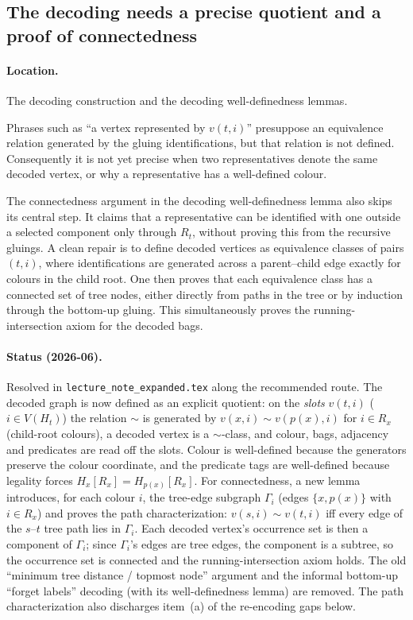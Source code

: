 \documentclass[11pt]{article}
\begin{document}
\subsection{The decoding needs a precise quotient and a proof of connectedness}

\paragraph{Location.} The decoding construction and the decoding
well-definedness lemmas.

Phrases such as ``a vertex represented by \(v(t,i)\)'' presuppose an equivalence
relation generated by the gluing identifications, but that relation is not
defined.  Consequently it is not yet precise when two representatives denote
the same decoded vertex, or why a representative has a well-defined colour.

The connectedness argument in the decoding well-definedness lemma also skips its
central step.  It
claims that a representative can be identified with one outside a selected
component only through \(R_t\), without proving this from the recursive gluings.
A clean repair is to define decoded vertices as equivalence classes of pairs
\((t,i)\), where identifications are generated across a parent--child edge
exactly for colours in the child root.  One then proves that each equivalence
class has a connected set of tree nodes, either directly from paths in the tree
or by induction through the bottom-up gluing.  This simultaneously proves the
running-intersection axiom for the decoded bags.

\paragraph{Status (2026-06).} Resolved in \texttt{lecture\_note\_expanded.tex}
along the recommended route.  The decoded graph is now defined as an explicit
quotient: on the \emph{slots} \(v(t,i)\) (\(i\in V(H_t)\)) the relation \(\sim\)
is generated by \(v(x,i)\sim v(p(x),i)\) for \(i\in R_x\) (child-root colours), a
decoded vertex is a \(\sim\)-class, and colour, bags, adjacency and predicates are
read off the slots.  Colour is well-defined because the generators preserve the
colour coordinate, and the predicate tags are well-defined because legality forces
\(H_x[R_x]=H_{p(x)}[R_x]\).  For connectedness, a new lemma introduces, for each
colour \(i\), the tree-edge subgraph \(\Gamma_i\) (edges \(\{x,p(x)\}\) with
\(i\in R_x\)) and proves the path characterization: \(v(s,i)\sim v(t,i)\) iff every
edge of the \(s\)--\(t\) tree path lies in \(\Gamma_i\).  Each decoded vertex's
occurrence set is then a component of \(\Gamma_i\); since \(\Gamma_i\)'s edges are
tree edges, the component is a subtree, so the occurrence set is connected and the
running-intersection axiom holds.  The old ``minimum tree distance / topmost node''
argument and the informal bottom-up ``forget labels'' decoding (with its
well-definedness lemma) are removed.  The path characterization also discharges
item~(a) of the re-encoding gaps below.
\end{document}
